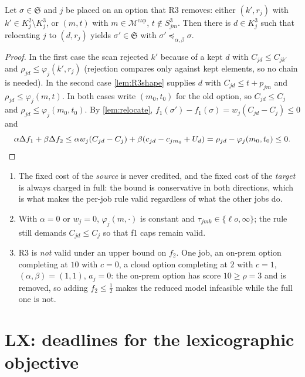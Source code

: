 \documentclass[11pt,a4paper]{article}
\newcommand{\M}{\mathcal{M}}
\newcommand{\Mcap}{\M^{\mathrm{cap}}}
\newcommand{\Sched}{\mathfrak{S}}
\newcommand{\preceqW}{\preceq_{\alpha,\beta}}
\begin{document}
\begin{lemma}[R3 moves]\label{lem:R3move}
Let $\sigma\in\Sched$ and $j$ be placed on an option that R3 removes:
either $(k',r_j)$ with $k'\in K^2_j\setminus K^3_j$, or $(m,t)$ with
$m\in\Mcap$, $t\notin S^3_{jm}$. Then there is $d\in K^3_j$ such that
relocating $j$ to $(d,r_j)$ yields $\sigma'\in\Sched$ with
$\sigma'\preceqW\sigma$.
\end{lemma}
\begin{proof}
In the first case the scan rejected $k'$ because of a kept $d$ with
$C_{jd}\le C_{jk'}$ and $\rho_{jd}\le\varphi_j(k',r_j)$ (rejection compares
only against kept elements, so no chain is needed). In the second case
\cref{lem:R3shape} supplies $d$ with $C_{jd}\le t+p_{jm}$ and
$\rho_{jd}\le\varphi_j(m,t)$. In both cases write $(m_0,t_0)$ for the old
option, so $C_{jd}\le C_j$ and $\rho_{jd}\le\varphi_j(m_0,t_0)$. By
\cref{lem:relocate}, $f_1(\sigma')-f_1(\sigma)=w_j(C_{jd}-C_j)\le0$ and
\[
\alpha\Delta f_1+\beta\Delta f_2\le \alpha w_j(C_{jd}-C_j)+\beta(c_{jd}-c_{jm_0}+U_d)
=\rho_{jd}-\varphi_j(m_0,t_0)\le0 .\qedhere
\]
\end{proof}

\begin{remark}
\begin{enumerate}[nosep]
\item The fixed cost of the \emph{source} is never credited, and the fixed
  cost of the \emph{target} is always charged in full: the bound is
  conservative in both directions, which is what makes the per-job rule
  valid regardless of what the other jobs do.
\item With $\alpha=0$ or $w_j=0$, $\varphi_j(m,\cdot)$ is constant and
  $\tau_{jmk}\in\{\ell o,\infty\}$; the rule still demands $C_{jd}\le C_j$ so
  that f1 caps remain valid.
\item R3 is \emph{not} valid under an upper bound on $f_2$. One job, an
  on-prem option completing at $10$ with $c=0$, a cloud option completing at
  $2$ with $c=1$, $(\alpha,\beta)=(1,1)$, $a_j=0$: the on-prem option has
  score $10\ge\rho=3$ and is removed, so adding $f_2\le\tfrac12$ makes the
  reduced model infeasible while the full one is not.
\end{enumerate}
\end{remark}

\section{LX: deadlines for the lexicographic objective}\label{sec:LX}
\end{document}
